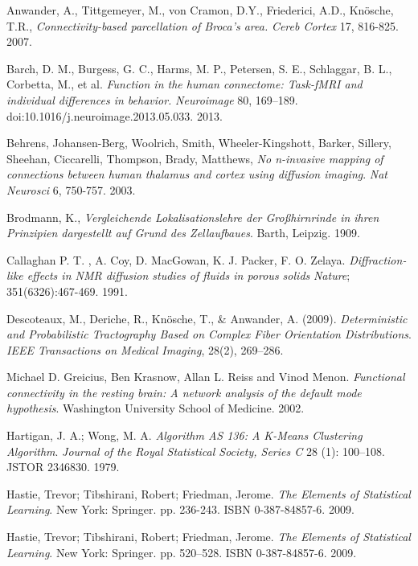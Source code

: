 \begin{thebibliography}{9}

 Anwander, A., Tittgemeyer, M., von Cramon, D.Y., Friederici, A.D., Knösche, T.R., \emph{Connectivity-based parcellation of Broca's area.} \textit{Cereb Cortex} 17, 816-825. 2007. 

 Barch, D. M., Burgess, G. C., Harms, M. P., Petersen, S. E., Schlaggar, B. L., Corbetta, M., et al. \emph{Function in the human connectome: Task-fMRI and individual differences in behavior.} \textit{Neuroimage} 80, 169–189. doi:10.1016/j.neuroimage.2013.05.033. 2013.

 Behrens, Johansen-Berg, Woolrich,  Smith, Wheeler-Kingshott, Barker, Sillery, Sheehan, Ciccarelli, Thompson, Brady, Matthews, \emph{No n-invasive mapping of connections between human thalamus and cortex using diffusion imaging}. \textit{Nat Neurosci} 6, 750-757. 2003.

 Brodmann,  K., \emph{Vergleichende  Lokalisationslehre  der  Großhirnrinde  in ihren Prinzipien dargestellt auf Grund des Zellaufbaues}. Barth, Leipzig. 1909. 

 Callaghan P. T. , A. Coy, D. MacGowan, K. J. Packer, F. O. Zelaya. \emph{Diffraction-like effects in NMR diffusion studies of fluids in porous solids} \textit{Nature}; 351(6326):467-469. 1991.

 Descoteaux, M., Deriche, R., Knösche, T., \& Anwander, A. (2009). \emph{Deterministic and Probabilistic Tractography Based on Complex Fiber Orientation Distributions}. \textit{IEEE Transactions on Medical Imaging}, 28(2), 269–286.

 Michael D. Greicius, Ben Krasnow, Allan L. Reiss and Vinod Menon. \emph{Functional connectivity in the resting brain: A network analysis of the default mode hypothesis}. Washington University School of Medicine. 2002.

 Hartigan, J. A.; Wong, M. A. \emph{Algorithm AS 136: A K-Means Clustering Algorithm}. \textit{Journal of the Royal Statistical Society, Series C} 28 (1): 100–108. JSTOR 2346830. 1979.

 Hastie, Trevor; Tibshirani, Robert; Friedman, Jerome. \emph{The Elements of Statistical Learning}. New York: Springer. pp. 236-243. ISBN 0-387-84857-6. 2009.

 Hastie, Trevor; Tibshirani, Robert; Friedman, Jerome. \emph{The Elements of Statistical Learning}. New York: Springer. pp. 520–528. ISBN 0-387-84857-6. 2009.


\end{thebibliography}
